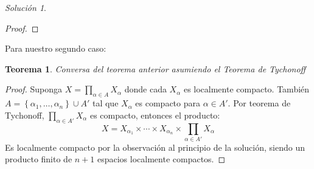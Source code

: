 \documentclass[notitlepage]{report}
\newtheorem{thm}{Teorema}
\theoremstyle{definition}
\theoremstyle{remark}
\newtheorem*{sol}{Solución}
\newcommand{\set}[1]{\left\lbrace #1 \right\rbrace}
\begin{document}
\begin{sol}
\begin{proof}
	\end{proof}
Para nuestro segundo caso:
	\begin{thm}
	Conversa del teorema anterior asumiendo el Teorema de Tychonoff
	\end{thm}
	\begin{proof}
		Suponga $ X = \prod_{\alpha \in A} X_\alpha $ donde cada $ X_\alpha $ es localmente compacto. También $ A = \set{\alpha_1, \ldots, \alpha_n} \cup A' $ tal que $X_\alpha $ es compacto para $ \alpha \in A' $. Por teorema de Tychonoff, $ \prod_{\alpha \in A'} X_\alpha$ es compacto, entonces el producto:
		\[ X = X_{\alpha_1} \times \cdots \times X_{\alpha_n}  \times \prod_{\alpha \in A'} X_\alpha \]
		Es localmente compacto por la observación al principio de la solución, siendo un producto finito de $ n+1 $ espacios localmente compactos.
	\end{proof}
\end{sol}
\end{document}
